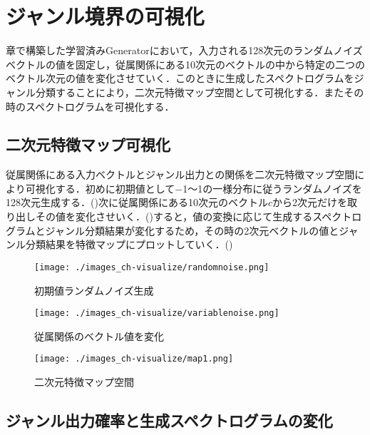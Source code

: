 \chapter{ジャンル境界の可視化}
\label{chapter4}章で構築した学習済みGeneratorにおいて，入力される128次元のランダムノイズベクトルの値を固定し，従属関係にある10次元のベクトルの中から特定の二つのベクトル次元の値を変化させていく．このときに生成したスペクトログラムをジャンル分類することにより，二次元特徴マップ空間として可視化する．またその時のスペクトログラムを可視化する．

\section{二次元特徴マップ可視化}
従属関係にある入力ベクトルとジャンル出力との関係を二次元特徴マップ空間により可視化する．初めに初期値として$-$1～1の一様分布に従うランダムノイズを128次元生成する．()次に従属関係にある10次元のベクトル$c$から2次元だけを取り出しその値を変化させいく．()すると，値の変換に応じて生成するスペクトログラムとジャンル分類結果が変化するため，その時の2次元ベクトルの値とジャンル分類結果を特徴マップにプロットしていく．()

\begin{figure}
	\begin{center}
		\texttt{[image: ./images\_ch-visualize/randomnoise.png]}
		\caption{初期値ランダムノイズ生成}
		\label{fig:randomnoise}
	\end{center}
\end{figure}
\begin{figure}
	\begin{center}
		\texttt{[image: ./images\_ch-visualize/variablenoise.png]}
		\caption{従属関係のベクトル値を変化}
		\label{fig:variablenoise}
	\end{center}
\end{figure}
\begin{figure}
	\begin{center}
		\texttt{[image: ./images\_ch-visualize/map1.png]}
		\caption{二次元特徴マップ空間}
		\label{fig:featmap}
	\end{center}
\end{figure}


\section{ジャンル出力確率と生成スペクトログラムの変化}


